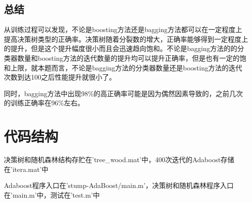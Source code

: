 \documentclass[UTF8,a4paper]{paper}
\begin{document}
\subsection{总结}
从训练过程可以发现，不论是boosting方法还是bagging方法都可以在一定程度上提高决策树类型的正确率。决策树随着分裂数的增大，正确率能够得到一定程度上的提升，但是这个提升幅度很小而且会迅速趋向饱和。不论是bagging方法的的分类器数量和boosting方法的迭代数量的提升均可以提升正确率，但是也有一定的饱和上限，就本题而言，不论是bagging方法的分类器数量还是boosting方法的迭代次数到达100之后性能提升就很小了。

同时，bagging方法中出现98\%的高正确率可能是因为偶然因素导致的，之前几次的训练正确率在96\%左右。

\section{代码结构}
决策树和随机森林结构存贮在'tree\_wood.mat'中，400次迭代的Adaboost存储在'itera.mat'中

Adaboost程序入口在'stump-AdaBoost/main.m'，决策树和随机森林程序入口在'main.m'中，测试在'test.m'中
\end{document}
